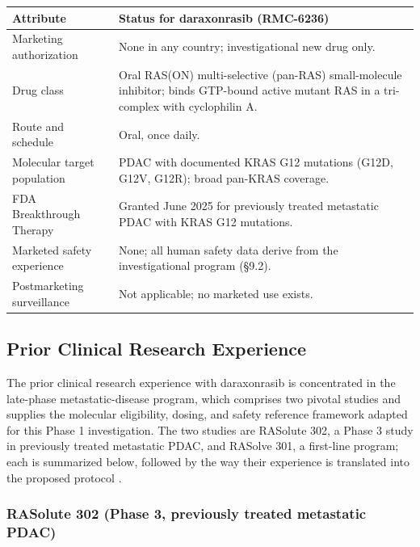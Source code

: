 \vspace{0.2em}
\noindent\begin{tabularx}{\textwidth}{L{4.4cm} Y}
\toprule
\textbf{Attribute} & \textbf{Status for daraxonrasib (RMC-6236)} \\
\midrule
Marketing authorization & None in any country; investigational new drug only. \\
Drug class & Oral RAS(ON) multi-selective (pan-RAS) small-molecule inhibitor; binds GTP-bound active mutant RAS in a tri-complex with cyclophilin A. \\
Route and schedule & Oral, once daily. \\
Molecular target population & PDAC with documented KRAS G12 mutations (G12D, G12V, G12R); broad pan-KRAS coverage. \\
FDA Breakthrough Therapy & Granted June 2025 for previously treated metastatic PDAC with KRAS G12 mutations. \\
Marketed safety experience & None; all human safety data derive from the investigational program (\S 9.2). \\
Postmarketing surveillance & Not applicable; no marketed use exists. \\
\bottomrule
\end{tabularx}
\vspace{-0.2cm}

\subsection{Prior Clinical Research Experience}

The prior clinical research experience with daraxonrasib is concentrated in the
late-phase metastatic-disease program, which comprises two pivotal studies and
supplies the molecular eligibility, dosing, and safety reference framework adapted
for this Phase 1 investigation. The two studies are RASolute 302, a Phase 3 study
in previously treated metastatic PDAC, and RASolve 301, a first-line program; each
is summarized below, followed by the way their experience is translated into the
proposed protocol \cite{daraxwhipple, onpremwhippl}.

\subsubsection*{RASolute 302 (Phase 3, previously treated metastatic PDAC)}

